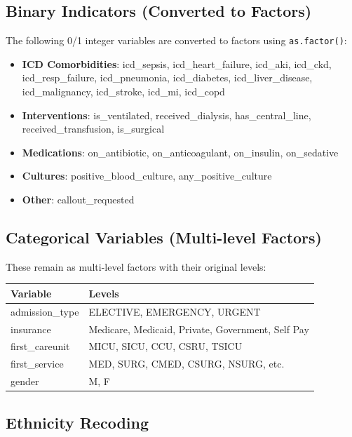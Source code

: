 \documentclass[11pt]{article}
\begin{document}
\subsection{Binary Indicators (Converted to Factors)}

The following 0/1 integer variables are converted to factors using \texttt{as.factor()}:

\begin{itemize}[leftmargin=*, nosep]
    \item \textbf{ICD Comorbidities}: icd\_sepsis, icd\_heart\_failure, icd\_aki, icd\_ckd, icd\_resp\_failure, icd\_pneumonia, icd\_diabetes, icd\_liver\_disease, icd\_malignancy, icd\_stroke, icd\_mi, icd\_copd
    \item \textbf{Interventions}: is\_ventilated, received\_dialysis, has\_central\_line, received\_transfusion, is\_surgical
    \item \textbf{Medications}: on\_antibiotic, on\_anticoagulant, on\_insulin, on\_sedative
    \item \textbf{Cultures}: positive\_blood\_culture, any\_positive\_culture
    \item \textbf{Other}: callout\_requested
\end{itemize}

\subsection{Categorical Variables (Multi-level Factors)}

These remain as multi-level factors with their original levels:

\begin{longtable}{L{3cm}L{11cm}}
\toprule
\textbf{Variable} & \textbf{Levels} \\
\midrule
\endhead
admission\_type & ELECTIVE, EMERGENCY, URGENT \\
insurance & Medicare, Medicaid, Private, Government, Self Pay \\
first\_careunit & MICU, SICU, CCU, CSRU, TSICU \\
first\_service & MED, SURG, CMED, CSURG, NSURG, etc. \\
gender & M, F \\
\bottomrule
\end{longtable}

\subsection{Ethnicity Recoding}
\label{sec:ethnicity}
\end{document}

